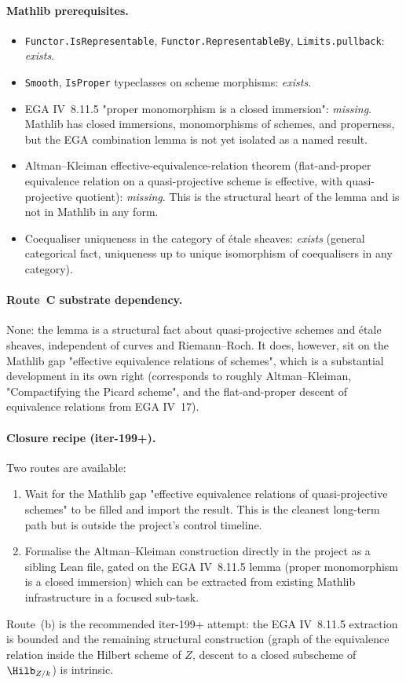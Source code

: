 \paragraph{Mathlib prerequisites.}
\begin{itemize}
  \item \texttt{Functor.IsRepresentable},
    \texttt{Functor.RepresentableBy}, \texttt{Limits.pullback}:
    \emph{exists}.
  \item \texttt{Smooth}, \texttt{IsProper} typeclasses on scheme
    morphisms: \emph{exists}.
  \item EGA IV~8.11.5 "proper monomorphism is a closed immersion":
    \emph{missing}. Mathlib has closed immersions, monomorphisms of
    schemes, and properness, but the EGA combination lemma is not yet
    isolated as a named result.
  \item Altman--Kleiman effective-equivalence-relation theorem
    (flat-and-proper equivalence relation on a quasi-projective
    scheme is effective, with quasi-projective quotient):
    \emph{missing}. This is the structural heart of the lemma and is
    not in Mathlib in any form.
  \item Coequaliser uniqueness in the category of \'etale sheaves:
    \emph{exists} (general categorical fact, uniqueness up to unique
    isomorphism of coequalisers in any category).
\end{itemize}

\paragraph{Route~C substrate dependency.} None: the lemma is a
structural fact about quasi-projective schemes and \'etale sheaves,
independent of curves and Riemann--Roch. It does, however, sit on the
Mathlib gap "effective equivalence relations of schemes", which is a
substantial development in its own right (corresponds to roughly
Altman--Kleiman, "Compactifying the Picard scheme", and the
flat-and-proper descent of equivalence relations from EGA IV~17).

\paragraph{Closure recipe (iter-199+).} Two routes are available:
\begin{enumerate}
  \item[(a)] Wait for the Mathlib gap "effective equivalence
    relations of quasi-projective schemes" to be filled and import
    the result. This is the cleanest long-term path but is outside
    the project's control timeline.
  \item[(b)] Formalise the Altman--Kleiman construction directly in
    the project as a sibling Lean file, gated on the EGA IV~8.11.5
    lemma (proper monomorphism is a closed immersion) which can be
    extracted from existing Mathlib infrastructure in a focused
    sub-task.
\end{enumerate}
Route~(b) is the recommended iter-199+ attempt: the EGA IV~8.11.5
extraction is bounded and the remaining structural construction
(graph of the equivalence relation inside the Hilbert scheme of $Z$,
descent to a closed subscheme of $\Hilb_{Z/k}$) is intrinsic.

